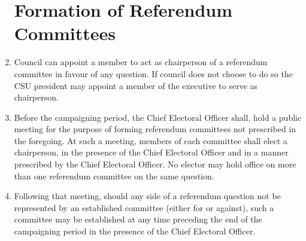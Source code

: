 \documentclass[oneside]{book}
\begin{document}
\begin{enumerate}
\section{\label{Formation_of_Referendum_Committees}Formation of Referendum
Committees }
\item Council can appoint a member to act as chairperson of a referendum
committee in favour of any question. If council does not choose to
do so the CSU president may appoint a member of the executive to serve
as chairperson. 
\item Before the campaigning period, the Chief Electoral Officer shall,
hold a public meeting for the purpose of forming referendum committees
not prescribed in the foregoing. At such a meeting, members of each
committee shall elect a chairperson, in the presence of the Chief
Electoral Officer and in a manner prescribed by the Chief Electoral
Officer. No elector may hold office on more than one referendum committee
on the same question.
\item Following that meeting, should any side of a referendum question not be represented by an
established committee (either for or against), such a committee may be established at any time
preceding the end of the campaigning period in the presence of the Chief Electoral Officer.


\end{enumerate}
\end{document}
